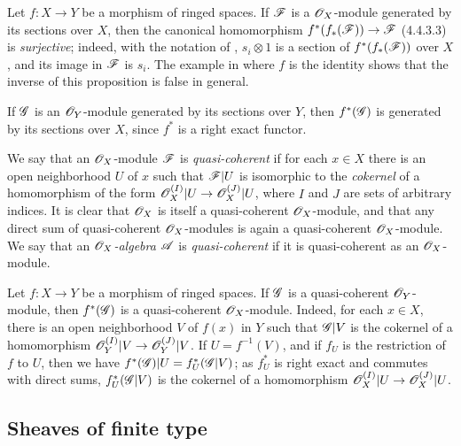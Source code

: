 \begin{env}[5.1.2]
\label{0.5.1.2}
Let $f:X\to Y$ be a morphism of ringed spaces.
If $\mathscr{F}$ is a $\mathscr{O}_X$-module generated by its sections over $X$, then the canonical homomorphism $f^*(f_*(\sh{F}))\to\sh{F}$ (4.4.3.3) is \emph{surjective};
indeed, with the notation of , $s_i\otimes 1$ is a section of $f^*(f_*(\mathscr{F}))$ over $X$, and its image in $\mathscr{F}$ is $s_i$.
The example in  where $f$ is the identity shows that the inverse of this proposition is false in general.

If $\mathscr{G}$ is an $\mathscr{O}_Y$-module generated by its sections over $Y$, then $f^*(\mathscr{G})$ is generated by its sections over $X$, since $f^*$ is a right exact functor.
\end{env}

\begin{env}[5.1.3]
\label{0.5.1.3}
We say that an $\mathscr{O}_X$-module $\mathscr{F}$ is \emph{quasi-coherent} if for each $x\in X$ there is an open neighborhood $U$ of $x$ such that $\mathscr{F}|U$ is isomorphic to the \emph{cokernel} of a homomorphism of the form $\OO_X^{(I)}|U\to\OO_X^{(J)}|U$, where $I$ and $J$ are sets of arbitrary indices.
It is clear that $\mathscr{O}_X$ is itself a quasi-coherent $\mathscr{O}_X$-module, and that any direct sum of quasi-coherent $\mathscr{O}_X$-modules is again a quasi-coherent $\mathscr{O}_X$-module.
We say that an \emph{$\mathscr{O}_X$-algebra $\mathscr{A}$} is \emph{quasi-coherent} if it is quasi-coherent as an $\mathscr{O}_X$-module.
\end{env}

\begin{env}[5.1.4]
\label{0.5.1.4}
Let $f:X\to Y$ be a morphism of ringed spaces.
If $\mathscr{G}$ is a quasi-coherent $\mathscr{O}_Y$-module, then $f^*(\mathscr{G})$ is a quasi-coherent $\mathscr{O}_X$-module.
Indeed, for each $x\in X$, there is an open neighborhood $V$ of $f(x)$ in $Y$ such that $\mathscr{G}|V$ is the cokernel of a homomorphism $\OO_Y^{(I)}|V\to\OO_Y^{(J)}|V$.
If $U=f^{-1}(V)$, and if $f_U$ is the restriction of $f$ to $U$, then we have $f^*(\mathscr{G})|U=f_U^*(\mathscr{G}|V)$;
as $f_U^*$ is right exact and commutes with direct sums, $f_U^*(\mathscr{G}|V)$ is the cokernel of a homomorphism $\OO_X^{(I)}|U\to\OO_X^{(J)}|U$.
\end{env}

\subsection{Sheaves of finite type}
\label{subsection:sheaves-of-finite-type}


